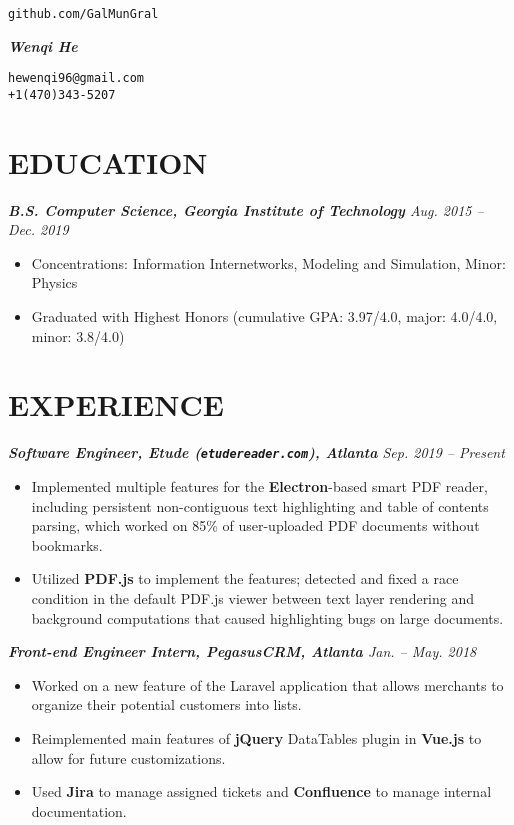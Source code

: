 \documentclass[10pt]{article}
\begin{document}
\noindent
\parbox{0.25\textwidth}{\hfill\texttt{github.com/GalMunGral}}
\parbox{0.5\textwidth}{\centerline{\Huge\slshape\bfseries Wenqi He}}
\parbox{0.25\textwidth}{\texttt{hewenqi96@gmail.com\\+1(470)343-5207}}
%
\vspace{-1em}
\section*{EDUCATION}
{\itshape 
{\bfseries B.S. Computer Science, Georgia Institute of Technology} \hfill Aug. 2015 -- Dec. 2019}
\begin{itemize}[leftmargin=15pt, noitemsep, topsep=0pt]
	\item Concentrations: Information Internetworks, Modeling and Simulation, Minor: Physics
	\item  Graduated with Highest Honors (cumulative GPA: 3.97/4.0, major: 4.0/4.0, minor: 3.8/4.0)
\end{itemize}
%
\vspace{-0.5em}
\section*{EXPERIENCE}
{\itshape {\bfseries Software Engineer, Etude (\texttt{etudereader.com}), Atlanta} \hfill Sep. 2019 -- Present}
\begin{itemize}[leftmargin=15pt, noitemsep, topsep=0pt]
\item Implemented multiple features for the \textbf{Electron}-based smart PDF reader, including persistent non-contiguous text highlighting and table of contents parsing, which worked on 85\% of user-uploaded PDF documents without bookmarks.
\item Utilized \textbf{PDF.js} to implement the features; detected and fixed a race condition in the default PDF.js viewer between text layer rendering and background computations that caused highlighting bugs on large documents.
\end{itemize}
\vspace{0.5em}
%
{\itshape {\bfseries Front-end Engineer Intern, PegasusCRM, Atlanta} \hfill Jan. -- May. 2018}
\begin{itemize}[leftmargin=15pt, noitemsep, topsep=0pt]
\item Worked on a new feature of the Laravel application that allows merchants to organize their potential customers into lists.
\item Reimplemented main features of \textbf{jQuery} DataTables plugin in \textbf{Vue.js} to allow for future customizations.
\item Used \textbf{Jira} to manage assigned tickets and \textbf{Confluence} to manage internal documentation.
\end{itemize}
%
\vspace{-0.5em}
\end{document}
